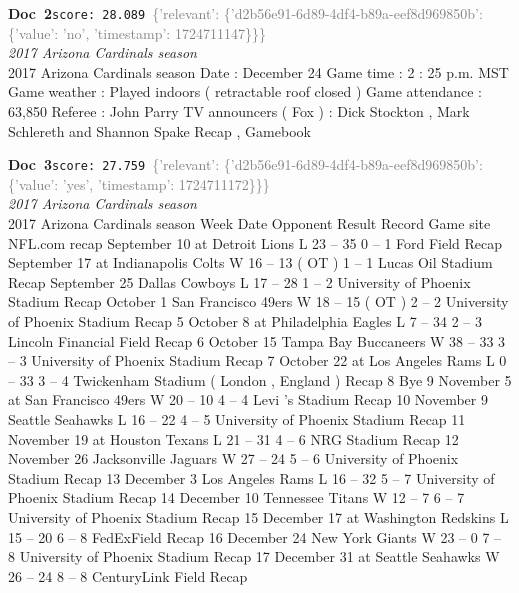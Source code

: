 \documentclass[a4paper,11pt]{article}
\begin{document}
\begin{docenv}
{\footnotesize\textcolor{doccolor}{\textbf{Doc~2}}}\hfill{\tiny\texttt{score:~28.089}}\ {\tiny\textcolor{gray}{\{'relevant': \{'d2b56e91-6d89-4df4-b89a-eef8d969850b': \{'value': 'no', 'timestamp': 1724711147\}\}\}}}\\[3pt]
{\small\textit{2017 Arizona Cardinals season}}\\[2pt]
\vspace{2pt}
{\footnotesize 2017 Arizona Cardinals season
Date : December 24 Game time : 2 : 25 p.m. MST Game weather : Played indoors ( retractable roof closed ) Game attendance : 63,850 Referee : John Parry TV announcers ( Fox ) : Dick Stockton , Mark Schlereth and Shannon Spake Recap , Gamebook}
\end{docenv}
\begin{docenv}
{\footnotesize\textcolor{doccolor}{\textbf{Doc~3}}}\hfill{\tiny\texttt{score:~27.759}}\ {\tiny\textcolor{gray}{\{'relevant': \{'d2b56e91-6d89-4df4-b89a-eef8d969850b': \{'value': 'yes', 'timestamp': 1724711172\}\}\}}}\\[3pt]
{\small\textit{2017 Arizona Cardinals season}}\\[2pt]
\vspace{2pt}
{\footnotesize 2017 Arizona Cardinals season
Week Date Opponent Result Record Game site NFL.com recap September 10 at Detroit Lions L 23 -- 35 0 -- 1 Ford Field Recap September 17 at Indianapolis Colts W 16 -- 13 ( OT ) 1 -- 1 Lucas Oil Stadium Recap September 25 Dallas Cowboys L 17 -- 28 1 -- 2 University of Phoenix Stadium Recap October 1 San Francisco 49ers W 18 -- 15 ( OT ) 2 -- 2 University of Phoenix Stadium Recap 5 October 8 at Philadelphia Eagles L 7 -- 34 2 -- 3 Lincoln Financial Field Recap 6 October 15 Tampa Bay Buccaneers W 38 -- 33 3 -- 3 University of Phoenix Stadium Recap 7 October 22 at Los Angeles Rams L 0 -- 33 3 -- 4 Twickenham Stadium ( London , England ) Recap 8 Bye 9 November 5 at San Francisco 49ers W 20 -- 10 4 -- 4 Levi 's Stadium Recap 10 November 9 Seattle Seahawks L 16 -- 22 4 -- 5 University of Phoenix Stadium Recap 11 November 19 at Houston Texans L 21 -- 31 4 -- 6 NRG Stadium Recap 12 November 26 Jacksonville Jaguars W 27 -- 24 5 -- 6 University of Phoenix Stadium Recap 13 December 3 Los Angeles Rams L 16 -- 32 5 -- 7 University of Phoenix Stadium Recap 14 December 10 Tennessee Titans W 12 -- 7 6 -- 7 University of Phoenix Stadium Recap 15 December 17 at Washington Redskins L 15 -- 20 6 -- 8 FedExField Recap 16 December 24 New York Giants W 23 -- 0 7 -- 8 University of Phoenix Stadium Recap 17 December 31 at Seattle Seahawks W 26 -- 24 8 -- 8 CenturyLink Field Recap}
\end{docenv}
\end{document}
